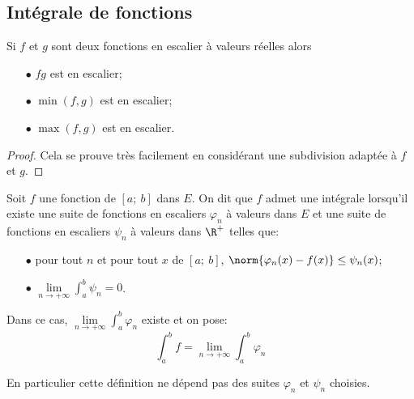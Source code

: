 \subsection{Intégrale de fonctions}

\begin{prop}
Si $f$ et $g$ sont deux fonctions en escalier à valeurs réelles alors 
\begin{itemize}
\item[$\bullet$] $fg$ est en escalier;
\item[$\bullet$] $\min(f,g)$ est en escalier;
\item[$\bullet$] $\max(f,g)$ est en escalier.
\end{itemize}
\end{prop}

\begin{proof}
Cela se prouve très facilement en considérant une subdivision adaptée à $f$ et $g$.
\end{proof}

\begin{de}
Soit $f$ une fonction de $[a;~b]$ dans $E$. On dit que $f$ admet une intégrale lorsqu'il existe une suite de fonctions en escaliers $\varphi_n$ à valeurs dans $E$ et une suite de fonctions en escaliers $\psi_n$ à valeurs dans $\R^{+}$ telles que:
\begin{itemize}
\item[$\bullet$] pour tout $n$ et pour tout $x$ de $[a;~b]$, $\norm{\varphi_n(x)-f(x)} \leq \psi_n(x)$;
\item[$\bullet$] $\lim \limits_{n \to +\infty} \displaystyle{\int_a^b} \psi_n = 0$.
\end{itemize}

Dans ce cas, $\lim \limits_{n \to +\infty} \displaystyle{\int_a^b} \varphi_n$ existe et on pose:
\[
\displaystyle{\int_a^b} f = \lim \limits_{n \to +\infty} \displaystyle{\int_a^b} \varphi_n
\]

En particulier cette définition ne dépend pas des suites $\varphi_n$ et $\psi_n$ choisies.
\end{de}

